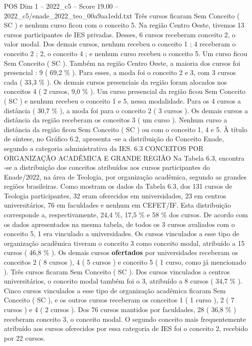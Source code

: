 \begin{textsample}{POS Dim 1 – 2022\_c5 – Score 19.00 – 2022\_c5/enade\_2022\_teo\_00a9aa1edd.txt}
Três cursos ficaram Sem Conceito ( SC ) e nenhum curso ficou com o conceito 5.
Na região Centro Oeste, tivemos 13 cursos participantes de IES privadas.
Desses, 6 cursos receberam conceito 2, o valor modal.
Dos demais cursos, nenhum recebeu o conceito 1 ; 4 receberam o conceito 2 ; 2, o conceito 4 ; e nenhum curso recebeu o conceito 5.
Um curso ficou Sem Conceito ( SC ).
Também na região Centro Oeste, a maioria dos cursos foi presencial : 9 ( 69,2 \% ).
Para esses, a moda foi o conceito 2 e 3, com 3 cursos cada ( 33,3 \% ).
Os demais cursos presenciais da região foram alocados nos conceitos 4 ( 2 cursos, 9,0 \% ).
Um curso presencial da região ficou Sem Conceito ( SC ) e nenhum recebeu o conceito 1 e 5, nessa modalidade.
Para os 4 cursos a distância ( 30,7 \% ), a moda foi para o conceito 2 ( 3 cursos ).
Os demais cursos a distância da região receberam os conceitos 3 ( um curso ).
Nenhum curso a distância da região ficou Sem Conceito ( SC ) ou com o conceito 1, 4 e 5.
À título de síntese, no Gráfico 6.2, apresenta -se a distribuição do Conceito Enade, segundo a categoria administrativa da IES. 6.3 CONCEITOS POR ORGANIZAÇÃO ACADÊMICA E GRANDE REGIÃO Na Tabela 6.3, encontra -se a distribuição dos conceitos atribuídos aos cursos participantes do Enade/2022, na área de Teologia, por organização acadêmica, segundo as grandes regiões brasileiras.
Como mostram os dados da Tabela 6.3, dos 131 cursos de Teologia participantes, 32 eram oferecidos em universidades, 23 em centros universitários, 76 em faculdades e nenhum em CEFET/IF.
Esta distribuição corresponde a, respectivamente, 24,4 \%, 17,5 \% e 58 \% dos cursos.
De acordo com os dados apresentados na mesma tabela, de todos os 3 cursos avaliados com o conceito 5, 1 era vinculado a universidades.
Os cursos vinculados a esse tipo de organização acadêmica tiveram o conceito 3 como conceito modal, atribuído a 15 cursos ( 46,8 \% ).
Os demais cursos \textbf{ofertados} por universidades receberam os conceitos 2 ( 8 cursos ), 4 ( 5 cursos ) e conceito 5 ( 1 curso, como já mencionado ).
Três cursos ficaram Sem Conceito ( SC ).
Dos cursos vinculados a centros universitários, o conceito modal também foi o 3, atribuído a 8 cursos ( 34,7 \% ).
Cinco cursos vinculados a esse tipo de organização acadêmica ficaram Sem Conceito ( SC ), e os outros cursos receberam os conceitos 1 ( 1 curso ), 2 ( 7 cursos ) e 4 ( 2 cursos ).
Dos 76 cursos mantidos por faculdades, 28 ( 36,8 \% ) receberam conceito 3, o conceito modal.
O segundo conceito mais frequentemente atribuído aos cursos oferecidos por essa categoria de IES foi o conceito 2, recebido por 22 cursos.

\end{textsample}
